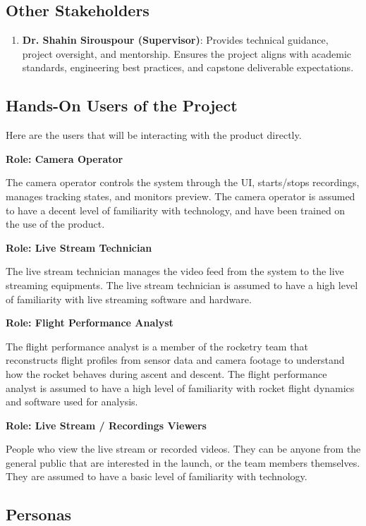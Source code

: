 \documentclass[12pt]{article}
\begin{document}
\subsection{Other Stakeholders}

\begin{enumerate}
  \item \textbf{Dr. Shahin Sirouspour (Supervisor)}: Provides
        technical guidance, project oversight, and mentorship. Ensures
        the project aligns with academic standards, engineering best
        practices, and capstone deliverable expectations.
\end{enumerate}

\subsection{Hands-On Users of the Project}

Here are the users that will be interacting with the product directly.

\textbf{Role: Camera Operator}

The camera operator controls the system through the UI, starts/stops
recordings, manages tracking states, and monitors preview. The camera operator
is assumed to have a decent level of familiarity with technology, and have been
trained on the use of the product.

\textbf{Role: Live Stream Technician}

The live stream technician manages the video feed from the system to the live
streaming equipments. The live stream technician is assumed to have a high
level of familiarity with live streaming software and hardware.

\textbf{Role: Flight Performance Analyst}

The flight performance analyst is a member of the rocketry team that
reconstructs flight profiles from sensor data and camera footage to understand
how the rocket behaves during ascent and descent. The flight performance
analyst is assumed to have a high level of familiarity with rocket flight
dynamics and software used for analysis.

\textbf{Role: Live Stream / Recordings Viewers}

People who view the live stream or recorded videos. They can be anyone from the
general public that are interested in the launch, or the team members
themselves. They are assumed to have a basic level of familiarity with
technology.

\subsection{Personas}
\end{document}
